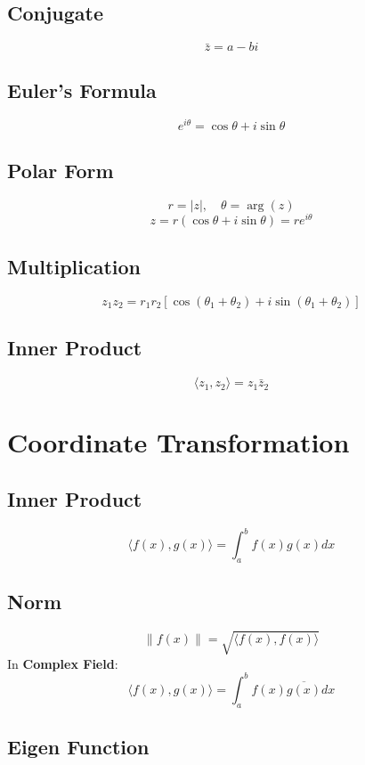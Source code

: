 \documentclass{article}
\begin{document}
\subsection{Conjugate}
\[
    \bar{z} = a - bi
\]

\subsection{Euler's Formula}

\[
    e^{i\theta} = \cos \theta + i\sin \theta
\]

\subsection{Polar Form}
\[
    r = |z|, \quad \theta = \arg(z)
\]
\[
    z = r(\cos \theta + i\sin \theta) = re^{i\theta}
\]

\subsection{Multiplication}
\[
    z_1 z_2 = r_1 r_2 \left[\cos(\theta_1 + \theta_2) + i\sin(\theta_1 + \theta_2)\right]
\]

\subsection{Inner Product}

\[
    \langle z_1, z_2 \rangle = z_1 \bar{z}_2
\]


\newpage
\section{Coordinate Transformation}

\subsection{Inner Product}

\[
    \langle f(x), g(x) \rangle = \int_a^b f(x) g(x) dx
\]

\subsection{Norm}

\[
    \|f(x)\| = \sqrt{\langle f(x), f(x) \rangle}
\]
In \textbf{Complex Field}:
\[
    \langle f(x), g(x) \rangle = \int_a^b f(x) \overline{g(x)} dx
\]

\subsection{Eigen Function}
\end{document}
